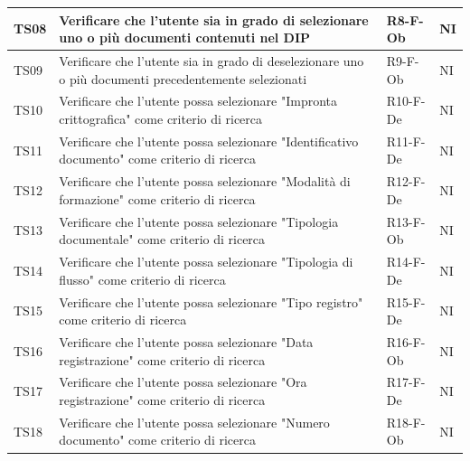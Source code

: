 \documentclass[a4paper,12pt]{article}
\begin{document}
\begin{longtable}{|M{1.2cm}|M{6.3cm}|M{2.5cm}|M{1.5cm}|}
                TS08 & Verificare che l'utente sia in grado di selezionare uno o più documenti contenuti nel DIP & R8-F-Ob & NI \\
                \hline

                TS09 & Verificare che l'utente sia in grado di deselezionare uno o più documenti precedentemente selezionati & R9-F-Ob & NI \\
                \hline

                TS10 & Verificare che l'utente possa selezionare "Impronta crittografica" come criterio di ricerca & R10-F-De & NI \\
                \hline

                TS11 & Verificare che l'utente possa selezionare "Identificativo documento" come criterio di ricerca & R11-F-De & NI \\
                \hline

                TS12 & Verificare che l'utente possa selezionare "Modalità di formazione" come criterio di ricerca & R12-F-De & NI \\
                \hline

                TS13 & Verificare che l'utente possa selezionare "Tipologia documentale" come criterio di ricerca & R13-F-Ob & NI \\
                \hline

                TS14 & Verificare che l'utente possa selezionare "Tipologia di flusso" come criterio di ricerca & R14-F-De & NI \\
                \hline

                TS15 & Verificare che l'utente possa selezionare "Tipo registro" come criterio di ricerca & R15-F-De & NI \\
                \hline
               
                TS16 & Verificare che l'utente possa selezionare "Data registrazione" come criterio di ricerca & R16-F-Ob & NI \\
                \hline
                
                TS17 & Verificare che l'utente possa selezionare "Ora registrazione" come criterio di ricerca & R17-F-De & NI \\
                \hline
                
                TS18 & Verificare che l'utente possa selezionare "Numero documento" come criterio di ricerca & R18-F-Ob & NI \\
                \hline


\end{longtable}
\end{document}
